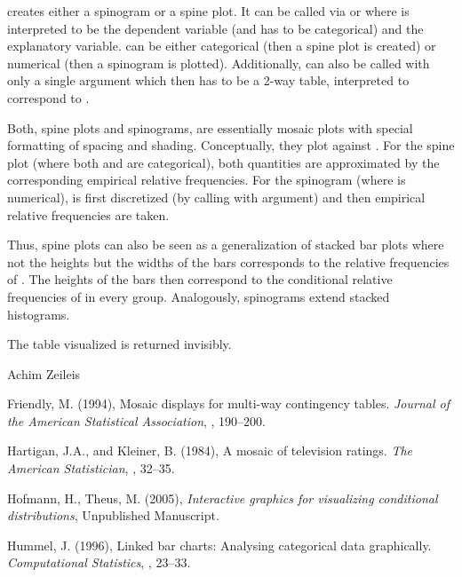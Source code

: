 %
\begin{Details}\relax
{} creates either a spinogram or a spine plot.  It can
be called via  or  where
 is interpreted to be the dependent variable (and has to be
categorical) and  the explanatory variable.   can be
either categorical (then a spine plot is created) or numerical (then a
spinogram is plotted).  Additionally,  can also be
called with only a single argument which then has to be a 2-way table,
interpreted to correspond to .

Both, spine plots and spinograms, are essentially mosaic plots with
special formatting of spacing and shading.  Conceptually, they plot
 against .  For the spine plot (where both
 and  are categorical), both quantities are approximated
by the corresponding empirical relative frequencies.  For the
spinogram (where  is numerical),  is first discretized
(by calling  with  argument) and then
empirical relative frequencies are taken.

Thus, spine plots can also be seen as a generalization of stacked bar
plots where not the heights but the widths of the bars corresponds to
the relative frequencies of . The heights of the bars then
correspond to the conditional relative frequencies of  in
every  group. Analogously, spinograms extend stacked
histograms.
\end{Details}
%
\begin{Value}
The table visualized is returned invisibly.
\end{Value}
%
\begin{Author}\relax
Achim Zeileis 
\end{Author}
%
\begin{References}\relax
Friendly, M. (1994), Mosaic displays for multi-way contingency tables.
\emph{Journal of the American Statistical Association}, ,
190--200.

Hartigan, J.A., and Kleiner, B. (1984), A mosaic of television ratings.
\emph{The American Statistician}, , 32--35.

Hofmann, H., Theus, M. (2005), \emph{Interactive graphics for visualizing
conditional distributions}, Unpublished Manuscript.

Hummel, J. (1996), Linked bar charts: Analysing categorical data graphically.
\emph{Computational Statistics}, , 23--33.
\end{References}
